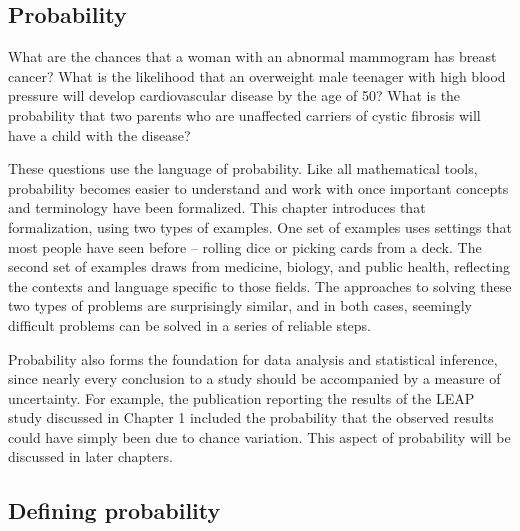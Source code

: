 
\begin{doublespace}

\chapter{Probability}
\label{probability}





What are the chances that a woman with an abnormal mammogram has breast cancer?  What is the likelihood that an overweight male teenager with high blood pressure will develop cardiovascular disease by the age of 50?  What is the probability that two parents who are unaffected carriers of cystic fibrosis will have a child with the disease? 

These questions use the language of probability. Like all mathematical tools, probability becomes easier to understand and work with once important concepts and terminology have been formalized. This chapter introduces that formalization, using two types of examples. One set of examples uses settings that most people have seen before -- rolling dice or picking cards from a deck. The second set of examples draws from medicine, biology, and public health, reflecting the contexts and language specific to those fields. The approaches to solving these two types of problems are surprisingly similar, and in both cases, seemingly difficult problems can be solved in a series of reliable steps.

Probability also forms the foundation for data analysis and statistical inference, since nearly every conclusion to a study should be accompanied by a measure of uncertainty. For example, the publication reporting the results of the LEAP study discussed in Chapter 1 included the probability that the observed results could have simply been due to chance variation. This aspect of probability will be discussed in later chapters.

\section{Defining probability}
\label{basicsOfProbability}


\end{doublespace}
